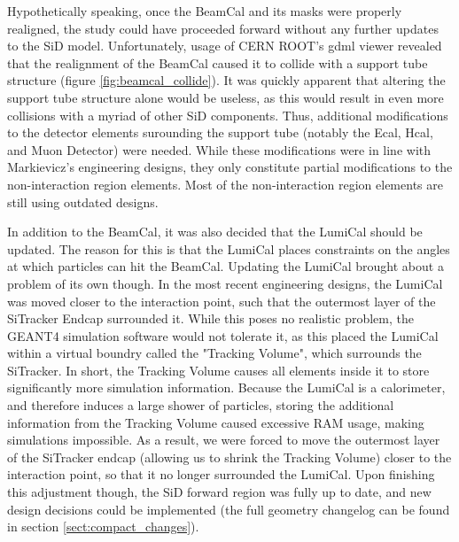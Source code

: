 \documentclass{report}
\begin{document}
            Hypothetically speaking, once the BeamCal and its masks were properly realigned, the study could have proceeded forward without any further updates to the SiD model. Unfortunately, usage of CERN ROOT's gdml viewer revealed that the realignment of the BeamCal caused it to collide with a support tube structure (figure \ref{fig:beamcal_collide}). It was quickly apparent that altering the support tube structure alone would be useless, as this would result in even more collisions with a myriad of other SiD components. Thus, additional modifications to the detector elements surounding the support tube (notably the Ecal, Hcal, and Muon Detector) were needed. While these modifications were in line with Markievicz's engineering designs, they only constitute partial modifications to the non-interaction region elements. Most of the non-interaction region elements are still using outdated designs.

            In addition to the BeamCal, it was also decided that the LumiCal should be updated. The reason for this is that the LumiCal places constraints on the angles at which particles can hit the BeamCal. Updating the LumiCal brought about a problem of its own though. In the most recent engineering designs, the LumiCal was moved closer to the interaction point, such that the outermost layer of the SiTracker Endcap surrounded it. While this poses no realistic problem, the GEANT4 simulation software would not tolerate it, as this placed the LumiCal within a virtual boundry called the "Tracking Volume", which surrounds the SiTracker. In short, the Tracking Volume causes all elements inside it to store significantly more simulation information. Because the LumiCal is a calorimeter, and therefore induces a large shower of particles, storing the additional information from the Tracking Volume caused excessive RAM usage, making simulations impossible. As a result, we were forced to move the outermost layer of the SiTracker endcap (allowing us to shrink the Tracking Volume) closer to the interaction point, so that it no longer surrounded the LumiCal. Upon finishing this adjustment though, the SiD forward region was fully up to date, and new design decisions could be implemented (the full geometry changelog can be found in section \ref{sect:compact_changes}).
\end{document}

